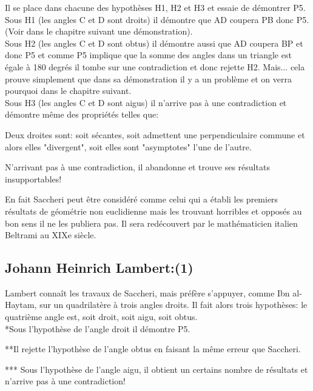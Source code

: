 \documentclass[a4paper, 12pt, twoside]{book}
\begin{document}
  Il se place dans chacune des hypothèses H1, H2 et H3 et essaie de démontrer P5.\\
  

Sous H1 (les angles C et D sont droits) il démontre que AD coupera PB donc P5.(Voir dans le chapitre suivant une démonstration).\\


Sous H2 (les angles C et D sont obtus) il démontre aussi que AD coupera BP et donc P5 et comme P5 implique que la somme des angles dans un triangle est égale à 180 degrés il tombe sur une contradiction et donc rejette H2. Mais... cela prouve simplement que dans sa démonstration il y a un problème  et on verra pourquoi dans le chapitre suivant.\\



Sous H3 (les angles C et D sont aigus) il n'arrive pas à une contradiction et démontre même des propriétés telles que:\

  Deux droites sont:
soit sécantes,
soit admettent une perpendiculaire commune et alors elles "divergent",
soit  elles sont "asymptotes" l'une de l'autre.\


N'arrivant pas à une contradiction, il abandonne et trouve ses résultats insupportables!\bigskip 


En fait Saccheri peut être considéré comme celui qui a établi les premiers résultats de géométrie non euclidienne mais les trouvant horribles et opposés au bon sens il ne les publiera pas. Il sera redécouvert par le mathématicien italien Beltrami au XIXe siècle.

\newpage \subsection{Johann Heinrich Lambert:(1)}


   Lambert connaît les travaux de Saccheri, mais préfère s’appuyer, comme Ibn al-Haytam, sur un quadrilatère à trois angles droits. Il fait alors trois hypothèses:
              le quatrième angle est, soit droit, soit aigu, soit obtus.\\
              
  *Sous l'hypothèse de l'angle droit il démontre P5.
  
  **Il rejette l'hypothèse de l'angle obtus en faisant la même erreur que Saccheri.

  *** Sous l'hypothèse de l'angle aigu, il obtient un certains nombre de résultats et n'arrive pas à une contradiction!\bigskip 
  
\end{document}
